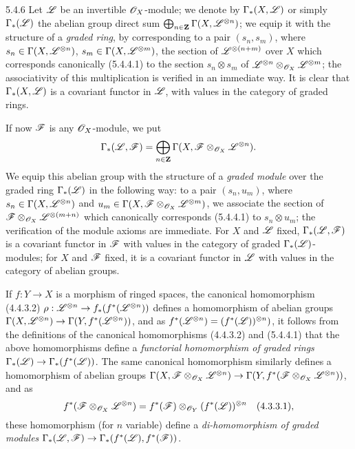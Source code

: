 \begin{env}{5.4.6}
\label{env-0.5.4.6}
Let $\mathscr{L}$ be an invertible $\mathscr{O}_X$-module; we denote by $\Gamma_*(X,\mathscr{L})$
or simply $\Gamma_*(\mathscr{L})$ the abelian group direct sum
$\bigoplus_{n\in\mathbf{Z}}\Gamma(X,\mathscr{L}^{\otimes n})$; we equip it with the
structure of a \emph{graded ring}, by corresponding to a pair $(s_n,s_m)$, where
$s_n\in\Gamma(X,\mathscr{L}^{\otimes n})$, $s_m\in\Gamma(X,\mathscr{L}^{\otimes m})$, the
section of $\mathscr{L}^{\otimes(n+m)}$ over $X$ which corresponds canonically
(5.4.4.1) to the section $s_n\otimes s_m$ of
$\mathscr{L}^{\otimes n}\otimes_{\mathscr{O}_X}\mathscr{L}^{\otimes m}$; the associativity of this
multiplication is verified in an immediate way. It is clear that
$\Gamma_*(X,\mathscr{L})$ is a covariant functor in $\mathscr{L}$, with values in the
category of graded rings.

If now $\mathscr{F}$ is any $\mathscr{O}_X$-module, we put
\[
  \Gamma_*(\mathscr{L},\mathscr{F})
  =\bigoplus_{n\in\mathbf{Z}}\Gamma(X,\mathscr{F}\otimes_{\mathscr{O}_X}\mathscr{L}^{\otimes n}).
\]
We equip this abelian group with the structure of a \emph{graded module} over
the graded ring $\Gamma_*(\mathscr{L})$ in the following way: to a pair $(s_n,u_m)$,
where $s_n\in\Gamma(X,\mathscr{L}^{\otimes n})$ and
$u_m\in\Gamma(X,\mathscr{F}\otimes_{\mathscr{O}_X}\mathscr{L}^{\otimes m})$, we associate the
section of $\mathscr{F}\otimes_{\mathscr{O}_X}\mathscr{L}^{\otimes(m+n)}$ which canonically
corresponds (5.4.4.1) to $s_n\otimes u_m$; the verification of the module axioms
are immediate. For $X$ and $\mathscr{L}$ fixed, $\Gamma_*(\mathscr{L},\mathscr{F})$ is a
covariant functor in $\mathscr{F}$ with values in the category of graded
$\Gamma_*(\mathscr{L})$-modules; for $X$ and $\mathscr{F}$ fixed, it is a covariant
functor in $\mathscr{L}$ with values in the category of abelian groups.

If $f:Y\to X$ is a morphism of ringed spaces, the canonical homomorphism
(4.4.3.2) $\rho:\mathscr{L}^{\otimes n}\to f_*(f^*(\mathscr{L}^{\otimes n}))$ defines a
homomorphism of abelian groups
$\Gamma(X,\mathscr{L}^{\otimes n})\to\Gamma(Y,f^*(\mathscr{L}^{\otimes n}))$, and as
$f^*(\mathscr{L}^{\otimes n})=(f^*(\mathscr{L}))^{\otimes n})$, it follows from the
definitions of the canonical homomorphisms (4.4.3.2) and (5.4.4.1) that the
above homomorphisms define a \emph{functorial homomorphism of graded rings
$\Gamma_*(\mathscr{L})\to\Gamma_*(f^*(\mathscr{L}))$}. The same canonical homomorphism
 similarly defines a homomorphism of abelian groups
$\Gamma(X,\mathscr{F}\otimes_{\mathscr{O}_X}\mathscr{L}^{\otimes n})
  \to\Gamma(Y,f^*(\mathscr{F}\otimes_{\mathscr{O}_X}\mathscr{L}^{\otimes n}))$, and as
\[
  f^*(\mathscr{F}\otimes_{\mathscr{O}_X}\mathscr{L}^{\otimes n})
  =f^*(\mathscr{F})\otimes_{\mathscr{O}_Y}(f^*(\mathscr{L}))^{\otimes n}
  \quad(4.3.3.1),
\]
these homomorphism (for $n$ variable) define a \emph{di-homomorphism of graded
modules $\Gamma_*(\mathscr{L},\mathscr{F})\to\Gamma_*(f^*(\mathscr{L}),f^*(\mathscr{F}))$}.
\end{env}

